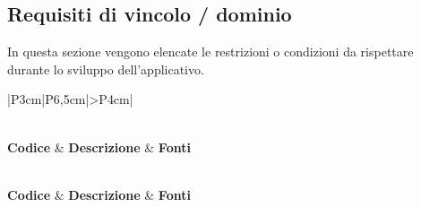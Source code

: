 \subsection{Requisiti di vincolo / dominio}
\par In questa sezione vengono elencate le restrizioni o condizioni da rispettare durante lo sviluppo dell'applicativo.

\bgroup
\begin{adjustwidth}{-0.5cm}{-0.5cm}
  \begin{longtable}{|P{3cm}|P{6,5cm}|>{\arraybackslash}P{4cm}|}
    \caption{Tabella dei requisiti di vincolo / dominio}
  	\label{tab:requisiti-vincolo-dominio} \\
    \hline
    \textbf{Codice} & \textbf{Descrizione} & \textbf{Fonti} \\
    \hline
    \endfirsthead

    \caption[]{Tabella dei requisiti di vincolo / dominio (continua)} \\
		\hline
		\textbf{Codice} & \textbf{Descrizione} & \textbf{Fonti} \\ 
		\hline
		\endhead

    \hline
		 \\ 
		\hline
		\endfoot

    \hline
		\endlastfoot


\end{longtable}
\end{adjustwidth}
